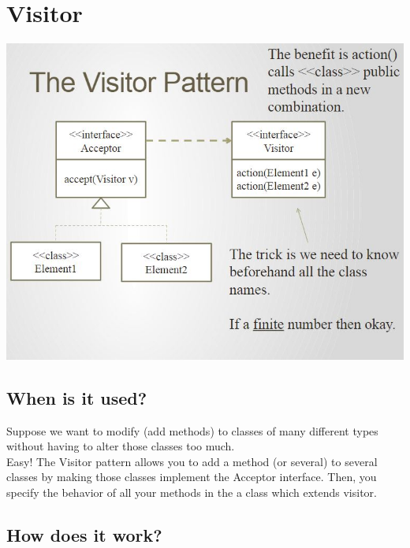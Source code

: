\documentclass[12pt]{article}
\theoremstyle{definition}
\begin{document}
\section{Visitor}
\includegraphics{visitor}

\subsection{When is it used?}
Suppose we want to modify (add methods) to classes of many different types without having to alter those classes too much.
\\ \linebreak
Easy! The Visitor pattern allows you to add a method (or several) to several classes by making those classes implement the Acceptor interface. Then, you specify the behavior of all your methods in the a class which extends visitor.

\subsection{How does it work?}
\end{document}
